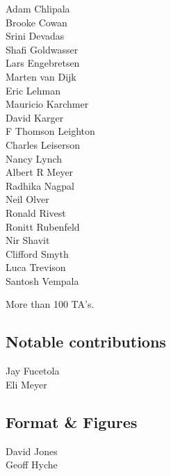 Adam Chlipala\\
Brooke Cowan\\
Srini Devadas\\
Shafi Goldwasser\\
Lars Engebretsen\\
Marten van Dijk\\
Eric Lehman\\
Mauricio Karchmer\\
David Karger\\
F Thomson Leighton\\
Charles Leiserson\\
Nancy Lynch\\
Albert R Meyer\\
Radhika Nagpal\\
Neil Olver\\
Ronald Rivest\\
Ronitt Rubenfeld\\
Nir Shavit\\
Clifford Smyth\\
Luca Trevison\\
Santosh Vempala

More than 100 TA's.

\subsection*{Notable contributions}

Jay Fucetola\\
Eli Meyer

\subsection*{Format \& Figures}
David Jones\\
Geoff Hyche

\endinput
